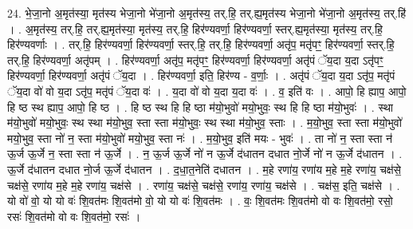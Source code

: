 \documentclass[17pt]{extarticle}
\begin{document}
24. भे॒जा॒नो अ॒मृत॑स्या॒ मृत॑स्य भेजा॒नो भे॑जा॒नो अ॒मृत॑स्य॒ तर्.हि॒ तर्.ह्य॒मृत॑स्य भेजा॒नो भे॑जा॒नो अ॒मृत॑स्य॒ तर्.हि॑ । . अ॒मृत॑स्य॒ तर्.हि॒ तर्.ह्य॒मृत॑स्या॒ मृत॑स्य॒ तर्.हि॒ हिर॑ण्यवर्णा॒ हिर॑ण्यवर्णा॒ स्तर्.ह्य॒मृत॑स्या॒ मृत॑स्य॒ तर्.हि॒ हिर॑ण्यवर्णाः । . तर्.हि॒ हिर॑ण्यवर्णा॒ हिर॑ण्यवर्णा॒ स्तर्.हि॒ तर्.हि॒ हिर॑ण्यवर्णा॒ अतृ॑प॒ मतृ॑पꣳ॒॒ हिर॑ण्यवर्णा॒ स्तर्.हि॒ तर्.हि॒ हिर॑ण्यवर्णा॒ अतृ॑पम् । . हिर॑ण्यवर्णा॒ अतृ॑प॒ मतृ॑पꣳ॒॒ हिर॑ण्यवर्णा॒ हिर॑ण्यवर्णा॒ अतृ॑पं ॅय॒दा य॒दा ऽतृ॑पꣳ॒॒ हिर॑ण्यवर्णा॒ हिर॑ण्यवर्णा॒ अतृ॑पं ॅय॒दा । . हिर॑ण्यवर्णा॒ इति॒ हिर॑ण्य - व॒र्णाः॒ । . अतृ॑पं ॅय॒दा य॒दा ऽतृ॑प॒ मतृ॑पं ॅय॒दा वो॑ वो य॒दा ऽतृ॑प॒ मतृ॑पं ॅय॒दा वः॑ । . य॒दा वो॑ वो य॒दा य॒दा वः॑ । . व॒ इति॑ वः । . आपो॒ हि ह्याप॒ आपो॒ हि ष्ठ स्थ ह्याप॒ आपो॒ हि ष्ठ । . हि ष्ठ स्थ हि हि ष्ठा म॑यो॒भुवो॑ मयो॒भुवः॒ स्थ हि हि ष्ठा म॑यो॒भुवः॑ । . स्था म॑यो॒भुवो॑ मयो॒भुवः॒ स्थ स्था म॑यो॒भुव॒ स्ता स्ता म॑यो॒भुवः॒ स्थ स्था म॑यो॒भुव॒ स्ताः । . म॒यो॒भुव॒ स्ता स्ता म॑यो॒भुवो॑ मयो॒भुव॒ स्ता नो॑ न॒ स्ता म॑यो॒भुवो॑ मयो॒भुव॒ स्ता नः॑ । . म॒यो॒भुव॒ इति॑ मयः - भुवः॑ । . ता नो॑ न॒ स्ता स्ता न॑ ऊ॒र्ज ऊ॒र्जे न॒ स्ता स्ता न॑ ऊ॒र्जे । . न॒ ऊ॒र्ज ऊ॒र्जे नो॑ न ऊ॒र्जे द॑धातन दधात नो॒र्जे नो॑ न ऊ॒र्जे द॑धातन । . ऊ॒र्जे द॑धातन दधात नो॒र्ज ऊ॒र्जे द॑धातन । . द॒धा॒त॒नेति॑ दधातन । . म॒हे रणा॑य॒ रणा॑य म॒हे म॒हे रणा॑य॒ चक्ष॑से॒ चक्ष॑से॒ रणा॑य म॒हे म॒हे रणा॑य॒ चक्ष॑से । . रणा॑य॒ चक्ष॑से॒ चक्ष॑से॒ रणा॑य॒ रणा॑य॒ चक्ष॑से । . चक्ष॑स॒ इति॒ चक्ष॑से । . यो वो॑ वो॒ यो यो वः॑ शि॒वत॑मः शि॒वत॑मो वो॒ यो यो वः॑ शि॒वत॑मः । . वः॒ शि॒वत॑मः शि॒वत॑मो वो वः शि॒वत॑मो॒ रसो॒ रसः॑ शि॒वत॑मो वो वः शि॒वत॑मो॒ रसः॑ । \newline
\end{document}
